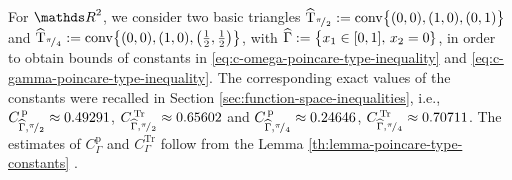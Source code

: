 For $\Rtwo$, we consider two basic triangles 
%
$	\widehat{\mathrm{T}}_{{}^{\pi}\!/_{2}} := {\rm conv} \big\{ (0, 0), (1, 0), (0, 1) \big\}$
and 
$\widehat{\mathrm{T}}_{{}^{\pi}\!/_{4}} := {\rm conv} \big\{ (0, 0), (1, 0), \big(\tfrac12, \tfrac12 \big) \big\}$,
%
with 
%
	$\widehat{\Gamma} := \big\{x_1 \in [0, 1], \, x_2 = 0\}$,
%
in order to obtain bounds of constants in 
\eqref{eq:c-omega-poincare-type-inequality} 
and \eqref{eq:c-gamma-poincare-type-inequality}. 
The corresponding exact values of the 
constants were recalled in Section \ref{sec:function-space-inequalities},
i.e.,
$C^{\, \mathrm{p}}_{\widehat{\Gamma}, {{}^{\pi}\!/_{2}}} \approx 0.49291$, $C^{\, \mathrm{Tr}}_{\widehat{\Gamma}, {{}^{\pi}\!/_{2}}} \approx 0.65602$ and 
$C^{\, \mathrm{p}}_{\widehat{\Gamma}, {{}^{\pi}\!/_{4}}} \approx 0.24646$, $C^{\, \mathrm{Tr}}_{\widehat{\Gamma}, {{}^{\pi}\!/_{4}}} \approx 0.70711$.
The estimates of $C^{\mathrm{p}}_{\Gamma}$ and $C^{\mathrm{Tr}}_{\Gamma}$ follow 
from the Lemma \ref{th:lemma-poincare-type-constants} 
\cite[Section 2]{RefArxivMatculevichRepin2015}. 
%
